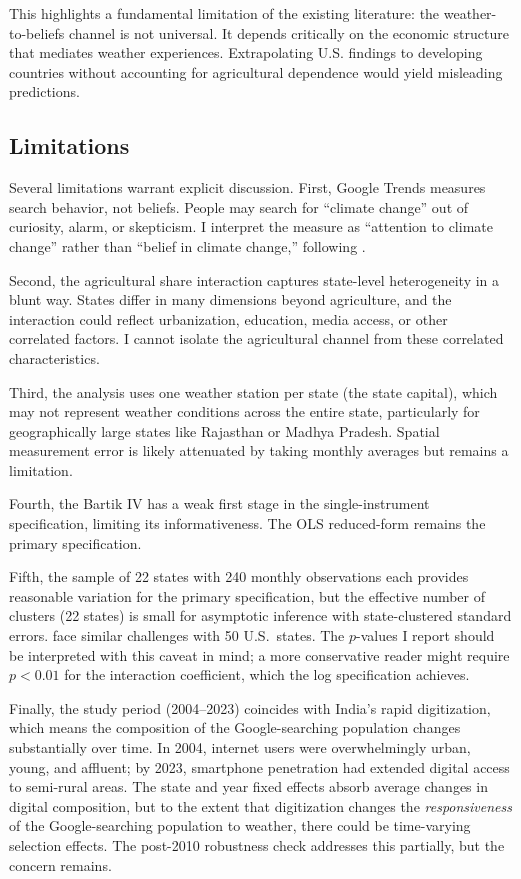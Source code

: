 \documentclass[12pt]{article}
\begin{document}
This highlights a fundamental limitation of the existing literature: the weather-to-beliefs channel is not universal. It depends critically on the economic structure that mediates weather experiences. Extrapolating U.S. findings to developing countries without accounting for agricultural dependence would yield misleading predictions.

\subsection{Limitations}

Several limitations warrant explicit discussion. First, Google Trends measures search behavior, not beliefs. People may search for ``climate change'' out of curiosity, alarm, or skepticism. I interpret the measure as ``attention to climate change'' rather than ``belief in climate change,'' following \citet{herrnstadt2014}.

Second, the agricultural share interaction captures state-level heterogeneity in a blunt way. States differ in many dimensions beyond agriculture, and the interaction could reflect urbanization, education, media access, or other correlated factors. I cannot isolate the agricultural channel from these correlated characteristics.

Third, the analysis uses one weather station per state (the state capital), which may not represent weather conditions across the entire state, particularly for geographically large states like Rajasthan or Madhya Pradesh. Spatial measurement error is likely attenuated by taking monthly averages but remains a limitation.

Fourth, the Bartik IV has a weak first stage in the single-instrument specification, limiting its informativeness. The OLS reduced-form remains the primary specification.

Fifth, the sample of 22 states with 240 monthly observations each provides reasonable variation for the primary specification, but the effective number of clusters (22 states) is small for asymptotic inference with state-clustered standard errors. \citet{eganmullin2012} face similar challenges with 50 U.S.\ states. The $p$-values I report should be interpreted with this caveat in mind; a more conservative reader might require $p < 0.01$ for the interaction coefficient, which the log specification achieves.

Finally, the study period (2004--2023) coincides with India's rapid digitization, which means the composition of the Google-searching population changes substantially over time. In 2004, internet users were overwhelmingly urban, young, and affluent; by 2023, smartphone penetration had extended digital access to semi-rural areas. The state and year fixed effects absorb average changes in digital composition, but to the extent that digitization changes the \textit{responsiveness} of the Google-searching population to weather, there could be time-varying selection effects. The post-2010 robustness check addresses this partially, but the concern remains.
\end{document}
